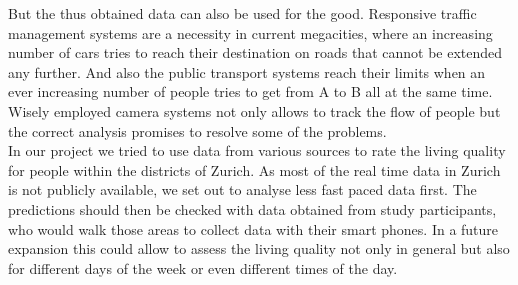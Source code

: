 \documentclass[letterpaper]{article}
\begin{document}
\indent But the thus obtained data can also be used for the good. Responsive traffic management systems are a necessity in current megacities, where an increasing number of cars tries to reach their destination on roads that cannot be extended any further. And also the public transport systems reach their limits when an ever increasing number of people tries to get from A to B all at the same time. Wisely employed camera systems not only allows to track the flow of people but the correct analysis promises to resolve some of the problems.\\
\indent In our project we tried to use data from various sources to rate the living quality for people within the districts of Zurich. As most of the real time data in Zurich is not publicly available, we set out to analyse less fast paced data first. The predictions should then be checked with data obtained from study participants, who would walk those areas to collect data with their smart phones. In a future expansion this could allow to assess the living quality not only in general but also for different days of the week or even different times of the day.
\end{document}
